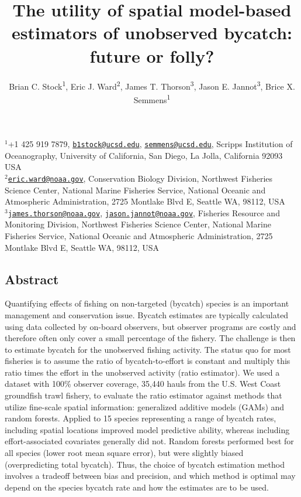 \documentclass[]{article}
\title{The utility of spatial model-based estimators of unobserved bycatch:
future or folly?}
\author{Brian C. Stock\textsuperscript{1}, Eric J. Ward\textsuperscript{2},
James T. Thorson\textsuperscript{3}, Jason E. Jannot\textsuperscript{3},
Brice X. Semmens\textsuperscript{1}}
\date{}
\begin{document}
\maketitle

\(^1\)+1 425 919 7879,
\href{mailto:b1stock@ucsd.edu}{\nolinkurl{b1stock@ucsd.edu}},
\href{mailto:semmens@ucsd.edu}{\nolinkurl{semmens@ucsd.edu}}, Scripps
Institution of Oceanography, University of California, San Diego, La
Jolla, California 92093 USA\\
\(^2\)\href{mailto:eric.ward@noaa.gov}{\nolinkurl{eric.ward@noaa.gov}},
Conservation Biology Division, Northwest Fisheries Science Center,
National Marine Fisheries Service, National Oceanic and Atmospheric
Administration, 2725 Montlake Blvd E, Seattle WA, 98112, USA\\
\(^3\)\href{mailto:james.thorson@noaa.gov}{\nolinkurl{james.thorson@noaa.gov}},
\href{mailto:jason.jannot@noaa.gov}{\nolinkurl{jason.jannot@noaa.gov}},
Fisheries Resource and Monitoring Division, Northwest Fisheries Science
Center, National Marine Fisheries Service, National Oceanic and
Atmospheric Administration, 2725 Montlake Blvd E, Seattle WA, 98112,
USA\\

\subsection{Abstract}\label{abstract}

Quantifying effects of fishing on non-targeted (bycatch) species is an
important management and conservation issue. Bycatch estimates are
typically calculated using data collected by on-board observers, but
observer programs are costly and therefore often only cover a small
percentage of the fishery. The challenge is then to estimate bycatch for
the unobserved fishing activity. The status quo for most fisheries is to
assume the ratio of bycatch-to-effort is constant and multiply this
ratio times the effort in the unobserved activity (ratio estimator). We
used a dataset with 100\% observer coverage, 35,440 hauls from the U.S.
West Coast groundfish trawl fishery, to evaluate the ratio estimator
against methods that utilize fine-scale spatial information: generalized
additive models (GAMs) and random forests. Applied to 15 species
representing a range of bycatch rates, including spatial locations
improved model predictive ability, whereas including effort-associated
covariates generally did not. Random forests performed best for all
species (lower root mean square error), but were slightly biased
(overpredicting total bycatch). Thus, the choice of bycatch estimation
method involves a tradeoff between bias and precision, and which method
is optimal may depend on the species bycatch rate and how the estimates
are to be used.
\end{document}
